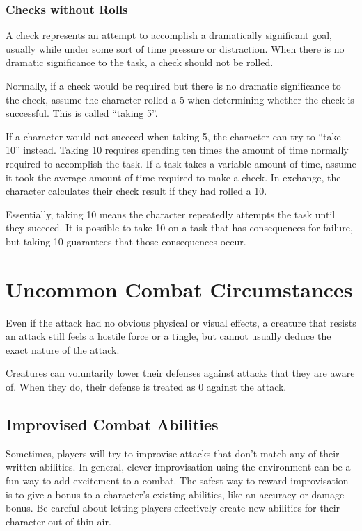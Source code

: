     \subsubsection{Checks without Rolls}
      A check represents an attempt to accomplish a dramatically significant goal, usually while under some sort of time pressure or distraction.
      When there is no dramatic significance to the task, a check should not be rolled.

      Normally, if a check would be required but there is no dramatic significance to the check, assume the character rolled a 5 when determining whether the check is successful.
      This is called ``taking 5''.

      If a character would not succeed when taking 5, the character can try to ``take 10'' instead.
      Taking 10 requires spending ten times the amount of time normally required to accomplish the task.
      If a task takes a variable amount of time, assume it took the average amount of time required to make a check.
      In exchange, the character calculates their check result if they had rolled a 10.

      Essentially, taking 10 means the character repeatedly attempts the task until they succeed.
      It is possible to take 10 on a task that has consequences for failure, but taking 10 guarantees that those consequences occur.

\section{Uncommon Combat Circumstances}

  Even if the attack had no obvious physical or visual effects, a creature that resists an attack still feels a hostile force or a tingle, but cannot usually deduce the exact nature of the attack.

  Creatures can voluntarily lower their defenses against attacks that they are aware of.
  When they do, their defense is treated as 0 against the attack.

  \subsection{Improvised Combat Abilities}
    Sometimes, players will try to improvise attacks that don't match any of their written abilities.
    In general, clever improvisation using the environment can be a fun way to add excitement to a combat.
    The safest way to reward improvisation is to give a bonus to a character's existing abilities, like an accuracy or damage bonus.
    Be careful about letting players effectively create new abilities for their character out of thin air.

